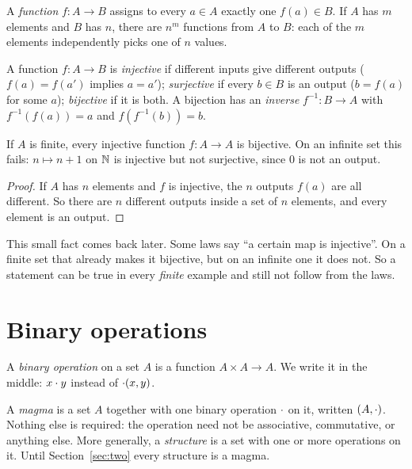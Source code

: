 \documentclass[11pt,a4paper]{article}
\begin{document}
A \emph{function} $f\colon A\to B$ assigns to every $a\in A$ exactly one $f(a)\in B$. If $A$ has $m$ elements and $B$
has $n$, there are $n^m$ functions from $A$ to $B$: each of the $m$ elements independently picks one of $n$ values.

\begin{definition}
A function $f\colon A\to B$ is
\emph{injective} if different inputs give different outputs ($f(a)=f(a')$ implies $a=a'$);
\emph{surjective} if every $b\in B$ is an output ($b=f(a)$ for some $a$);
\emph{bijective} if it is both. A bijection has an \emph{inverse} $f^{-1}\colon B\to A$ with $f^{-1}(f(a))=a$ and
$f(f^{-1}(b))=b$.
\end{definition}

\begin{proposition}\label{prop:finite}
If $A$ is finite, every injective function $f\colon A\to A$ is bijective. On an infinite set this fails:
$n\mapsto n+1$ on $\mathbb{N}$ is injective but not surjective, since $0$ is not an output.
\end{proposition}

\begin{proof}
If $A$ has $n$ elements and $f$ is injective, the $n$ outputs $f(a)$ are all different. So there are $n$ different
outputs inside a set of $n$ elements, and every element is an output.
\end{proof}

This small fact comes back later. Some laws say ``a certain map is injective''. On a finite set that already makes
it bijective, but on an infinite one it does not. So a statement can be true in every \emph{finite} example and still
not follow from the laws.


\section{Binary operations}

\begin{definition}
A \emph{binary operation} on a set $A$ is a function $A\times A\to A$. We write it in the middle: $x\cdot y$ instead of
${\cdot}(x,y)$.
\end{definition}

\begin{definition}
A \emph{magma} is a set $A$ together with one binary operation $\cdot$ on it, written $(A,\cdot)$. Nothing else is
required: the operation need not be associative, commutative, or anything else. More generally, a \emph{structure} is
a set with one or more operations on it. Until Section~\ref{sec:two} every structure is a magma.
\end{definition}
\end{document}
